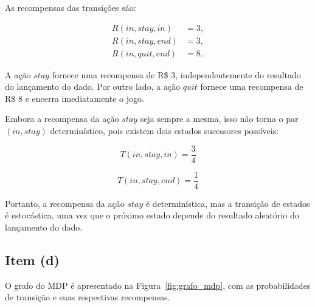 As recompensas das transições são:

\[
\begin{aligned}
    R(in,stay,in) &= 3,\\
    R(in,stay,end) &= 3,\\
    R(in,quit,end) &= 8.
\end{aligned}
\]

A ação $stay$ fornece uma recompensa de R\$ 3,
independentemente do resultado do lançamento do dado.
Por outro lado, a ação $quit$ fornece uma recompensa
de R\$ 8 e encerra imediatamente o jogo.

Embora a recompensa da ação $stay$ seja sempre
a mesma, isso não torna o par $(in,stay)$
determinístico, pois existem dois estados sucessores
possíveis:

\[
    T(in,stay,in) = \frac{3}{4}
\]

\[
    T(in,stay,end) = \frac{1}{4}
\]

Portanto, a recompensa da ação $stay$ é
determinística, mas a transição de estados é
estocástica, uma vez que o próximo estado depende
do resultado aleatório do lançamento do dado.

\subsection{Item (d)}

O grafo do MDP é apresentado na
Figura~\ref{fig:grafo_mdp}, com as probabilidades
de transição e suas respectivas recompensas.

